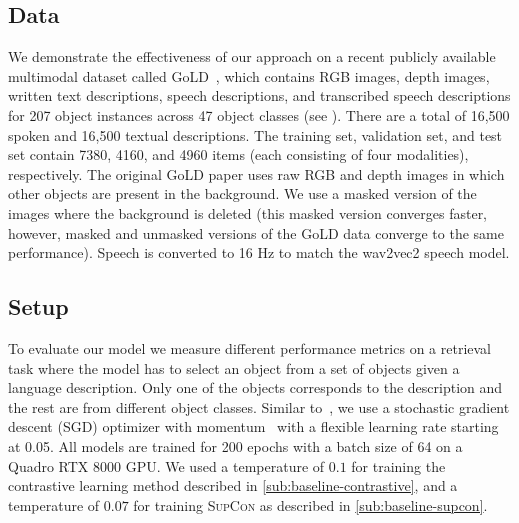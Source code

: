 \documentclass[sigconf,natbib=true,anonymous=true]{acmart}
\newcommand{\supcon}{\textsc{SupCon}}
\begin{document}
\subsection{Data}
\label{sec:Data}

We demonstrate the effectiveness of our approach on a recent publicly available multimodal dataset called GoLD~\citep{GoLD_UMBC}, which contains RGB images, depth images, written text descriptions, speech descriptions, and transcribed speech descriptions for 207 object instances across 47 object classes (see ). There are a total of 16,500 spoken and 16,500 textual descriptions. The training set, validation set, and test set contain 7380, 4160, and 4960 items (each consisting of four modalities), respectively. 
The original GoLD paper uses raw RGB and depth images in which other objects are present in the background. We use a masked version of the images where the background is deleted (this masked version converges faster, however, masked and unmasked versions of the GoLD data converge to the same performance). Speech is converted to 16 Hz to match the wav2vec2 speech model.

\subsection{Setup}
\label{sec:setup}
To evaluate our model we measure different performance metrics on a retrieval task where the model has to select an object from a set of objects given a language description. Only one of the objects corresponds to the description and the rest are from different object classes.
% 
Similar to~\citet{NEURIPS2020_supervised_contrastive}, we use a stochastic gradient descent (SGD) optimizer with momentum~\citep{ruder2016overviewSGD} with a flexible learning rate starting at 0.05. 
All models are trained for 200 epochs with a batch size of 64 on a Quadro RTX 8000 GPU. We used a temperature of $0.1$ for training the contrastive learning method described in \cref{sub:baseline-contrastive}, and a temperature of $0.07$ for training \supcon{} as described in \cref{sub:baseline-supcon}.
\end{document}
